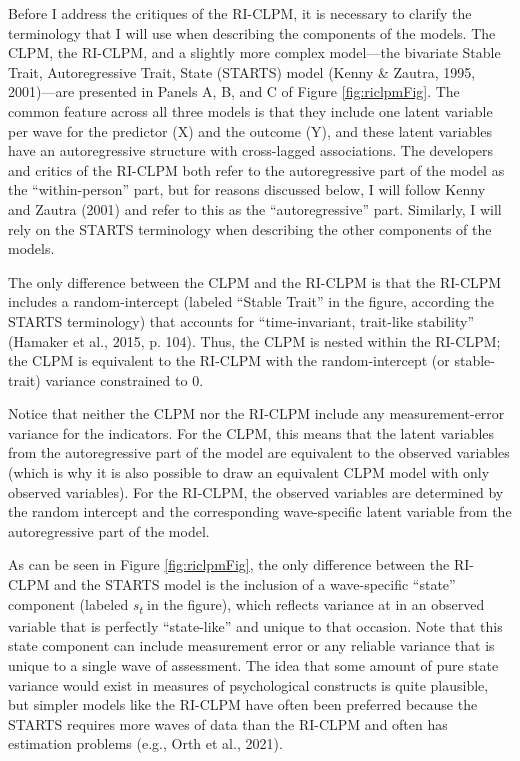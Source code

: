\documentclass[
  english,
  man,floatsintext]{apa6}
\begin{document}
Before I address the critiques of the RI-CLPM, it is necessary to clarify the terminology that I will use when describing the components of the models. The CLPM, the RI-CLPM, and a slightly more complex model---the bivariate Stable Trait, Autoregressive Trait, State (STARTS) model (Kenny \& Zautra, 1995, 2001)---are presented in Panels A, B, and C of Figure \ref{fig:riclpmFig}. The common feature across all three models is that they include one latent variable per wave for the predictor (X) and the outcome (Y), and these latent variables have an autoregressive structure with cross-lagged associations. The developers and critics of the RI-CLPM both refer to the autoregressive part of the model as the ``within-person'' part, but for reasons discussed below, I will follow Kenny and Zautra (2001) and refer to this as the ``autoregressive'' part. Similarly, I will rely on the STARTS terminology when describing the other components of the models.

The only difference between the CLPM and the RI-CLPM is that the RI-CLPM includes a random-intercept (labeled ``Stable Trait'' in the figure, according the STARTS terminology) that accounts for ``time-invariant, trait-like stability'' (Hamaker et al., 2015, p. 104). Thus, the CLPM is nested within the RI-CLPM; the CLPM is equivalent to the RI-CLPM with the random-intercept (or stable-trait) variance constrained to 0.

Notice that neither the CLPM nor the RI-CLPM include any measurement-error variance for the indicators. For the CLPM, this means that the latent variables from the autoregressive part of the model are equivalent to the observed variables (which is why it is also possible to draw an equivalent CLPM model with only observed variables). For the RI-CLPM, the observed variables are determined by the random intercept and the corresponding wave-specific latent variable from the autoregressive part of the model.

As can be seen in Figure \ref{fig:riclpmFig}, the only difference between the RI-CLPM and the STARTS model is the inclusion of a wave-specific ``state'' component (labeled \emph{s\textsubscript{t}} in the figure), which reflects variance at in an observed variable that is perfectly ``state-like'' and unique to that occasion. Note that this state component can include measurement error or any reliable variance that is unique to a single wave of assessment. The idea that some amount of pure state variance would exist in measures of psychological constructs is quite plausible, but simpler models like the RI-CLPM have often been preferred because the STARTS requires more waves of data than the RI-CLPM and often has estimation problems (e.g., Orth et al., 2021).
\end{document}
